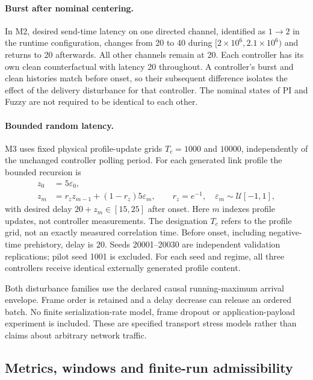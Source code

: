 \paragraph{Burst after nominal centering.}
In M2, desired send-time latency on one directed channel, identified as
$1\to2$ in the runtime configuration, changes from 20 to 40 during
$[2\times10^6,2.1\times10^6)$ and returns to 20 afterwards. All other
channels remain at 20. Each controller has its own clean counterfactual
with latency 20 throughout. A controller's burst and clean histories
match before onset, so their subsequent difference isolates the effect
of the delivery disturbance for that controller. The nominal states
of PI and Fuzzy are not required to be identical to each other.

\paragraph{Bounded random latency.}
M3 uses fixed physical profile-update grids $T_c=1000$ and $10000$,
independently of the unchanged controller polling period. For each
generated link profile the bounded recursion is
\begin{align}
 z_0&=5\varepsilon_0,\nonumber\\
 z_m&=r_z z_{m-1}+(1-r_z)5\varepsilon_m,
 \qquad r_z=e^{-1},\quad\varepsilon_m\sim\mathcal U[-1,1],
 \label{eq:eval_random_profile}
\end{align}
with desired delay $20+z_m\in[15,25]$ after onset. Here $m$ indexes
profile updates, not controller measurements. The designation $T_c$
refers to the profile grid, not an exactly measured correlation time.
Before onset, including negative-time prehistory, delay is 20. Seeds
20001--20030 are independent validation replications; pilot seed 1001
is excluded. For each seed and regime, all three controllers receive
identical externally generated profile content.

Both disturbance families use the declared causal running-maximum
arrival envelope. Frame order is retained and a delay decrease can
release an ordered batch. No finite serialization-rate model, frame
dropout or application-payload experiment is included. These are
specified transport stress models rather than claims about arbitrary
network traffic.

\subsection{Metrics, windows and finite-run admissibility}
\label{subsec:eval_metrics}


